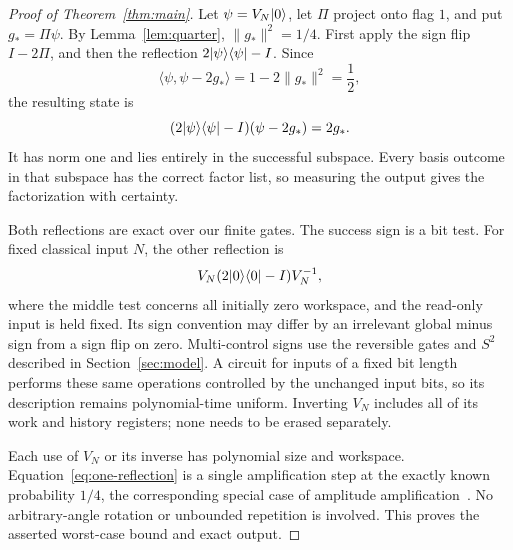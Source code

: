 \begin{proof}[Proof of Theorem~\ref{thm:main}]
Let $\psi=V_N\lvert 0\rangle$, let $\Pi$ project onto flag $1$, and put $g_*=\Pi\psi$. By Lemma~\ref{lem:quarter}, $\|g_*\|^2=1/4$. First apply the sign flip $I-2\Pi$, and then the reflection $2\lvert \psi\rangle\langle \psi\rvert-I$. Since
\[
 \langle\psi,\psi-2g_*\rangle=1-2\|g_*\|^2=\frac12,
\]
the resulting state is
\begin{equation}\label{eq:one-reflection}
 (2\lvert \psi\rangle\langle \psi\rvert-I)(\psi-2g_*)=2g_*.
\end{equation}
It has norm one and lies entirely in the successful subspace. Every basis outcome in that subspace has the correct factor list, so measuring the output gives the factorization with certainty.

Both reflections are exact over our finite gates. The success sign is a bit test. For fixed classical input $N$, the other reflection is
\[
 V_N(2\lvert 0\rangle\langle 0\rvert-I)V_N^{-1},
\]
where the middle test concerns all initially zero workspace, and the read-only input is held fixed. Its sign convention may differ by an irrelevant global minus sign from a sign flip on zero. Multi-control signs use the reversible gates and $S^2$ described in Section~\ref{sec:model}. A circuit for inputs of a fixed bit length performs these same operations controlled by the unchanged input bits, so its description remains polynomial-time uniform. Inverting $V_N$ includes all of its work and history registers; none needs to be erased separately.

Each use of $V_N$ or its inverse has polynomial size and workspace. Equation~\eqref{eq:one-reflection} is a single amplification step at the exactly known probability $1/4$, the corresponding special case of amplitude amplification~\cite[Section~2]{BHMT}. No arbitrary-angle rotation or unbounded repetition is involved. This proves the asserted worst-case bound and exact output.
\end{proof}
